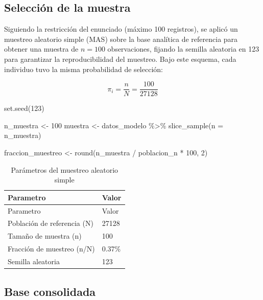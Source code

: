 \documentclass[
  spanish,
  letterpaper,
  DIV=11,
  numbers=noendperiod]{scrartcl}
\newenvironment{Shaded}{\begin{snugshade}}{\end{snugshade}}
\newcommand{\AttributeTok}[1]{\textcolor[rgb]{0.40,0.45,0.13}{#1}}
\newcommand{\DecValTok}[1]{\textcolor[rgb]{0.68,0.00,0.00}{#1}}
\newcommand{\FunctionTok}[1]{\textcolor[rgb]{0.28,0.35,0.67}{#1}}
\newcommand{\NormalTok}[1]{\textcolor[rgb]{0.00,0.23,0.31}{#1}}
\newcommand{\OtherTok}[1]{\textcolor[rgb]{0.00,0.23,0.31}{#1}}
\newcommand{\SpecialCharTok}[1]{\textcolor[rgb]{0.37,0.37,0.37}{#1}}
\begin{document}
\subsection{Selección de la muestra}\label{selecciuxf3n-de-la-muestra}

Siguiendo la restricción del enunciado (máximo 100 registros), se aplicó
un muestreo aleatorio simple (MAS) sobre la base analítica de referencia
para obtener una muestra de \(n=100\) observaciones, fijando la semilla
aleatoria en 123 para garantizar la reproducibilidad del muestreo. Bajo
este esquema, cada individuo tuvo la misma probabilidad de selección:

\[\pi_i = \frac{n}{N} = \frac{100}{27128}\]

\begin{Shaded}
\begin{Highlighting}[]
\FunctionTok{set.seed}\NormalTok{(}\DecValTok{123}\NormalTok{)}

\NormalTok{n\_muestra }\OtherTok{\textless{}{-}} \DecValTok{100}
\NormalTok{muestra }\OtherTok{\textless{}{-}}\NormalTok{ datos\_modelo }\SpecialCharTok{\%\textgreater{}\%} \FunctionTok{slice\_sample}\NormalTok{(}\AttributeTok{n =}\NormalTok{ n\_muestra)}

\NormalTok{fraccion\_muestreo }\OtherTok{\textless{}{-}} \FunctionTok{round}\NormalTok{(n\_muestra }\SpecialCharTok{/}\NormalTok{ poblacion\_n }\SpecialCharTok{*} \DecValTok{100}\NormalTok{, }\DecValTok{2}\NormalTok{)}
\end{Highlighting}
\end{Shaded}

\begin{longtable}[]{@{}ll@{}}
\caption{Parámetros del muestreo aleatorio simple}\tabularnewline
\toprule\noalign{}
Parametro & Valor \\
\midrule\noalign{}
\endfirsthead
\toprule\noalign{}
Parametro & Valor \\
\midrule\noalign{}
\endhead
\bottomrule\noalign{}
\endlastfoot
Población de referencia (N) & 27128 \\
Tamaño de muestra (n) & 100 \\
Fracción de muestreo (n/N) & 0.37\% \\
Semilla aleatoria & 123 \\
\end{longtable}

\subsection{Base consolidada}\label{base-consolidada}
\end{document}
